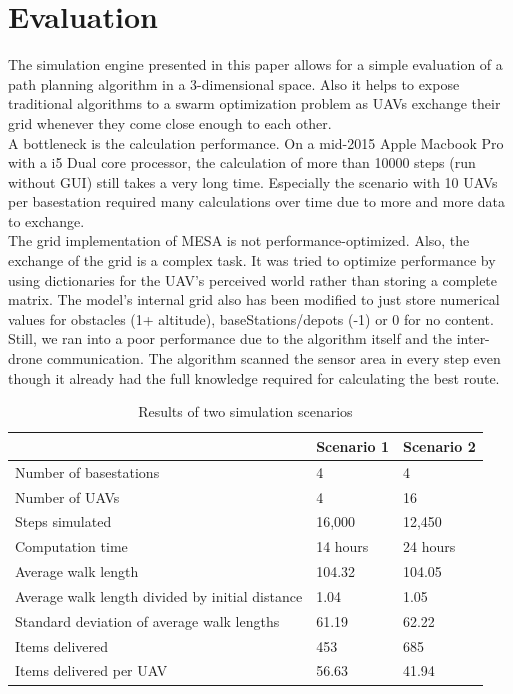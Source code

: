 \section{Evaluation}\label{sec:evaluation}
The simulation engine presented in this paper allows for a simple evaluation of a path planning algorithm in a 3-dimensional space. Also it helps to expose traditional algorithms to a swarm optimization problem as UAVs exchange their grid whenever they come close enough to each other.\\
A bottleneck is the calculation performance. On a mid-2015 Apple Macbook Pro with a i5 Dual core processor, the calculation of more than 10000 steps (run without GUI) still takes a very long time. Especially the scenario with 10 UAVs per basestation required many calculations over time due to more and more data to exchange. \\
The grid implementation of MESA is not performance-optimized. Also, the exchange of the grid is a complex task. It was tried to optimize performance by using dictionaries for the UAV's perceived world rather than storing a complete matrix. The model's internal grid also has been modified to just store numerical values for obstacles (1+ altitude), baseStations/depots (-1) or 0 for no content.\\
Still, we ran into a poor performance due to the algorithm itself and the inter-drone communication. The algorithm scanned the sensor area in every step even though it already had the full knowledge required for calculating the best route.  \\
 \begin{table}[tbhp]\label{tab:results}
 	\centering

  \begin{tabular}{ | l | l | l |}
    \hline
     & \textbf{Scenario 1} 					& \textbf{Scenario 2 }				\\ \hline
    Number of basestations 	& 4 								& 4 \\ \hline
    Number of UAVs 				& 4								& 16\\ \hline
    Steps simulated 				& 16,000 					& 12,450 \\ \hline
    Computation time 			& 14 hours 					& 24 hours \\ \hline
    Average walk length 		& 104.32 								& 104.05\\ \hline
    Average walk length divided by initial distance & 1.04 & 1.05 \\ \hline
    Standard deviation of average walk lengths & 61.19 & 62.22 \\ \hline
    Items delivered 				& 453							&  685\\ \hline
    Items delivered per UAV & 56.63 & 41.94 \\ \hline
    \hline
  \end{tabular}
	 	
  \caption{Results of two simulation scenarios}
 \end{table}
